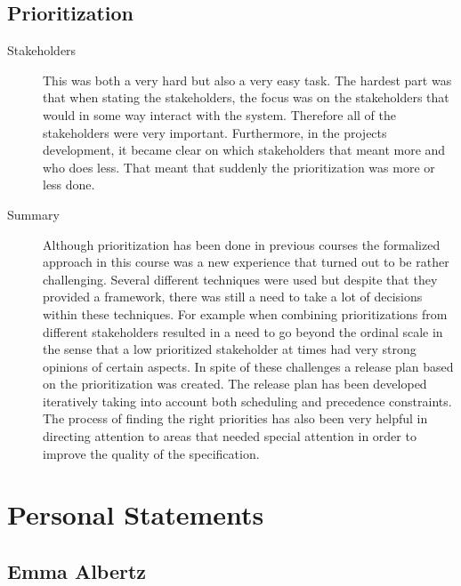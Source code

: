 \documentclass[10pt,a4paper]{article}
\begin{document}
\subsection{Prioritization}
\begin{description}
\item[Stakeholders] This was both a very hard but also a very easy task. The hardest part was that when stating the stakeholders, the focus was on the stakeholders that would in some way interact with the system. Therefore all of the stakeholders were very important. Furthermore, in the projects development, it became clear on which stakeholders that meant more and who does less. That meant that suddenly the prioritization was more or less done.

\item[Summary] Although prioritization has been done in previous courses the formalized approach in this course was  a new experience that turned out to be rather challenging. Several different techniques were used but despite that they provided a framework, there was still a need to take a lot of decisions within these techniques. For example when combining prioritizations from different stakeholders resulted in a need to go beyond the ordinal scale in the sense that a low prioritized stakeholder at times had very strong opinions of certain aspects. In spite of these challenges a release plan based on the prioritization was created. The release plan has been developed iteratively taking into account both scheduling and precedence constraints. The process of finding the right priorities has also been very helpful in directing attention to areas that needed special attention in order to improve the quality of the specification. 


\end{description}

\section{Personal Statements}

\subsection{Emma Albertz}
\end{document}
